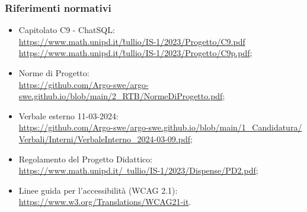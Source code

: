 \subsubsection{Riferimenti normativi}
\begin{itemize}
  \item Capitolato C9 - ChatSQL:\\ \href{https://www.math.unipd.it/~tullio/IS-1/2023/Progetto/C9.pdf}{https://www.math.unipd.it/\~tullio/IS-1/2023/Progetto/C9.pdf} \\ \href{https://www.math.unipd.it/~tullio/IS-1/2023/Progetto/C9.pdf}{https://www.math.unipd.it/\~tullio/IS-1/2023/Progetto/C9p.pdf};
  \item Norme di Progetto:\\ \href{https://github.com/Argo-swe/argo-swe.github.io/blob/main/2_RTB/NormeDiProgetto.pdf}{https://github.com/Argo-swe/argo-swe.github.io/blob/main/2\_RTB/\-NormeDiProgetto.pdf};
  \item Verbale esterno 11-03-2024:\\ \href{https://github.com/Argo-swe/argo-swe.github.io/blob/main/1_Candidatura/Verbali/Interni/VerbaleInterno_2024-03-09.pdf}{https://github.com/Argo-swe/argo-swe.github.io/blob/main/1\_Candidatura/ \\ Verbali/Interni/VerbaleInterno\_2024-03-09.pdf};
  \item Regolamento del Progetto Didattico:\\ \href{https://www.math.unipd.it/~tullio/IS-1/2023/Dispense/PD2.pdf}{https://www.math.unipd.it/~tullio/IS-1/2023/Dispense/PD2.pdf};
  \item Linee guida per l'accessibilità (WCAG 2.1):\\ \href{https://www.w3.org/Translations/WCAG21-it}{https://www.w3.org/Translations/WCAG21-it}.
\end{itemize}

